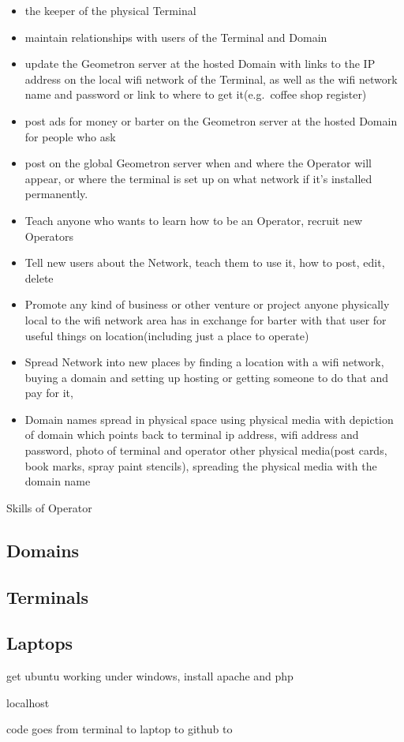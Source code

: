 \begin{itemize}
\tightlist
\item
  the keeper of the physical Terminal
\item
  maintain relationships with users of the Terminal and Domain
\item
  update the Geometron server at the hosted Domain with links to the IP
  address on the local wifi network of the Terminal, as well as the wifi
  network name and password or link to where to get it(e.g.~coffee shop
  register)
\item
  post ads for money or barter on the Geometron server at the hosted
  Domain for people who ask
\item
  post on the global Geometron server when and where the Operator will
  appear, or where the terminal is set up on what network if it's
  installed permanently.
\item
  Teach anyone who wants to learn how to be an Operator, recruit new
  Operators
\item
  Tell new users about the Network, teach them to use it, how to post,
  edit, delete
\item
  Promote any kind of business or other venture or project anyone
  physically local to the wifi network area has in exchange for barter
  with that user for useful things on location(including just a place to
  operate)
\item
  Spread Network into new places by finding a location with a wifi
  network, buying a domain and setting up hosting or getting someone to
  do that and pay for it,
\item
  Domain names spread in physical space using physical media with
  depiction of domain which points back to terminal ip address, wifi
  address and password, photo of terminal and operator other physical
  media(post cards, book marks, spray paint stencils), spreading the
  physical media with the domain name
\end{itemize}

Skills of Operator

\subsection{Domains}\label{domains}

\subsection{Terminals}\label{terminals}

\subsection{Laptops}\label{laptops}

get ubuntu working under windows, install apache and php

localhost

code goes from terminal to laptop to github to
